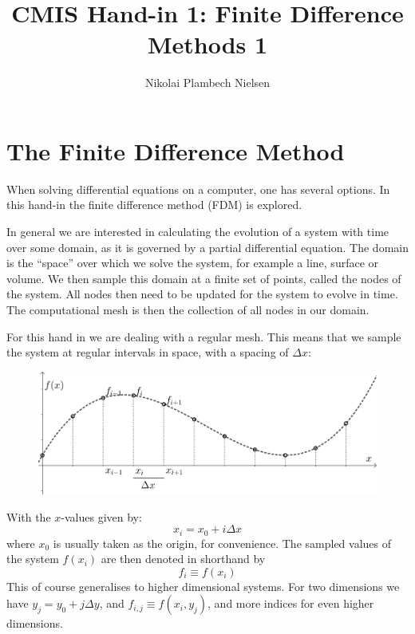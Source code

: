 \documentclass[sigconf]{acmart}
\begin{document}
%
\title{CMIS Hand-in 1: Finite Difference Methods 1}

\author{Nikolai Plambech Nielsen}


\maketitle

\section{The Finite Difference Method}
When solving differential equations on a computer, one has several options. In this hand-in the finite difference method (FDM) is explored.

In general we are interested in calculating the evolution of a system with time over some domain, as it is governed by a partial differential equation. The domain is the ``space'' over which we solve the system, for example a line, surface or volume. We then sample this domain at a finite set of points, called the nodes of the system. All nodes then need to be updated for the system to evolve in time. The computational mesh is then the collection of all nodes in our domain.

For this hand in we are dealing with a regular mesh. This means that we sample the system at regular intervals in space, with a spacing of $ \Delta x $:
\begin{figure}[H]
	\includegraphics[width=\linewidth]{finite_difference1.png}
\end{figure}
With the $ x $-values given by:
\begin{equation}\label{key}
	x_i = x_0 + i \Delta x
\end{equation}
where $ x_0 $ is usually taken as the origin, for convenience. The sampled values of the system $ f(x_i) $ are then denoted in shorthand by
\begin{equation}\label{key}
	f_i \equiv f(x_i)
\end{equation}
This of course generalises to higher dimensional systems. For two dimensions we have $ y_j = y_0 + j \Delta y$, and $ f_{i,j} \equiv f(x_i, y_j) $, and more indices for even higher dimensions.
\end{document}

